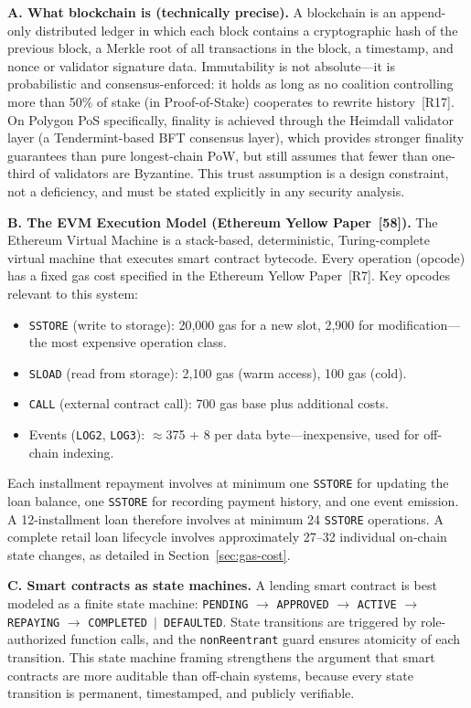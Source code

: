 \documentclass[12pt,a4paper]{report}
\begin{document}
\vspace{4pt}
\textbf{A. What blockchain is (technically precise).}
A blockchain is an append-only distributed ledger in which each block contains a cryptographic hash of the previous block, a Merkle root of all transactions in the block, a timestamp, and nonce or validator signature data. Immutability is not absolute---it is probabilistic and consensus-enforced: it holds as long as no coalition controlling more than 50\% of stake (in Proof-of-Stake) cooperates to rewrite history~[R17]. On Polygon PoS specifically, finality is achieved through the Heimdall validator layer (a Tendermint-based BFT consensus layer), which provides stronger finality guarantees than pure longest-chain PoW, but still assumes that fewer than one-third of validators are Byzantine. This trust assumption is a design constraint, not a deficiency, and must be stated explicitly in any security analysis.

\textbf{B. The EVM Execution Model (Ethereum Yellow Paper~[58]).}
The Ethereum Virtual Machine is a stack-based, deterministic, Turing-complete virtual machine that executes smart contract bytecode. Every operation (opcode) has a fixed gas cost specified in the Ethereum Yellow Paper~[R7]. Key opcodes relevant to this system:
\begin{itemize}[noitemsep]
  \item \texttt{SSTORE} (write to storage): 20,000 gas for a new slot, 2,900 for modification---the most expensive operation class.
  \item \texttt{SLOAD} (read from storage): 2,100 gas (warm access), 100 gas (cold).
  \item \texttt{CALL} (external contract call): 700 gas base plus additional costs.
  \item Events (\texttt{LOG2}, \texttt{LOG3}): $\approx$375 + 8 per data byte---inexpensive, used for off-chain indexing.
\end{itemize}
Each installment repayment involves at minimum one \texttt{SSTORE} for updating the loan balance, one \texttt{SSTORE} for recording payment history, and one event emission. A 12-installment loan therefore involves at minimum 24 \texttt{SSTORE} operations. A complete retail loan lifecycle involves approximately 27--32 individual on-chain state changes, as detailed in Section~\ref{sec:gas-cost}.

\textbf{C. Smart contracts as state machines.}
A lending smart contract is best modeled as a finite state machine: \texttt{PENDING} $\to$ \texttt{APPROVED} $\to$ \texttt{ACTIVE} $\to$ \texttt{REPAYING} $\to$ \texttt{COMPLETED $|$ DEFAULTED}. State transitions are triggered by role-authorized function calls, and the \texttt{nonReentrant} guard ensures atomicity of each transition. This state machine framing strengthens the argument that smart contracts are more auditable than off-chain systems, because every state transition is permanent, timestamped, and publicly verifiable.
\end{document}
